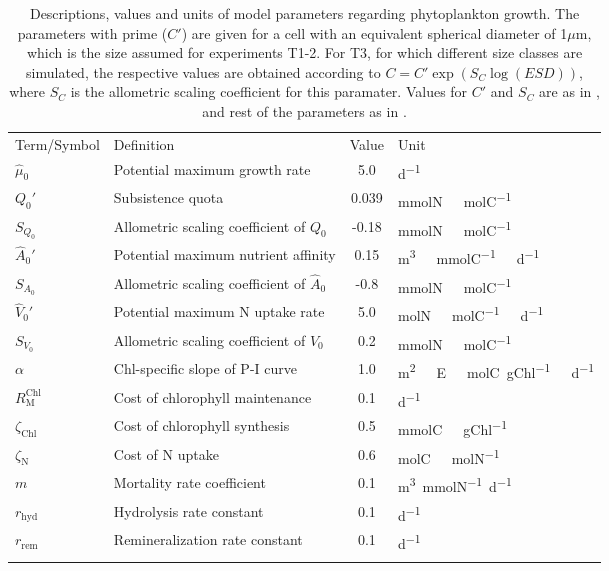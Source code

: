 \documentclass[gmd, manuscript]{copernicus}
\begin{document}
\begin{table*}[htb]
  \caption{ Descriptions, values and units of model parameters regarding phytoplankton growth. The parameters with prime ($C'$) are given for a cell with an equivalent spherical diameter of 1$\mu$m, which is the size assumed for experiments T1-2. For T3, for which different size classes are simulated, the respective values are obtained according to $C=C'\exp{(S_C \log (ESD))}$, where $S_C$ is the allometric scaling coefficient for this paramater. Values for $C'$ and $S_C$ are as in \citet{Smith2016}, and rest of the parameters as in \citet{Kerimoglu2021}. \label{T.pars}}
  \begin{tabular}{l l c l}
    \tophline
    Term/Symbol         & Definition                        & Value     & Unit\\
    \middlehline
    $\hat{\mu}_0$   & Potential maximum growth rate         & 5.0       & \unit{d^{-1}}\\
    $Q_0'$  & Subsistence quota                     & 0.039     & \unit{mmolN\ molC^{-1}}\\
    $S_{Q_0}$  & Allometric scaling coefficient of $Q_0$       & -0.18     & \unit{mmolN\ molC^{-1}}\\
    $\hat{A}_0'$     & Potential maximum nutrient affinity   & 0.15       & \unit{m^3\ mmolC^{-1}\ d^{-1}}\\
    $S_{A_0}$  & Allometric scaling coefficient of $\hat{A}_0$        & -0.8     & \unit{mmolN\ molC^{-1}}\\
    $\hat{V}_0'$     & Potential maximum N uptake rate       & 5.0       & \unit{molN\ molC^{-1}\ d^{-1}}\\
    $S_{V_0}$  & Allometric scaling coefficient of $\hat{V}_0$        & 0.2     & \unit{mmolN\ molC^{-1}}\\
    $\alpha$           & Chl-specific slope of P-I curve    & 1.0       & \unit{m^2\ E\ molC gChl^{-1}\ d^{-1}}\\
    $R^{\text{Chl}}_{\text{M}}$     & Cost of chlorophyll maintenance   & 0.1       & \unit{d^{-1}}\\
    $\zeta_{\text{Chl}}$   & Cost of chlorophyll synthesis  & 0.5       & \unit{mmolC\ gChl^{-1}}\\
    $\zeta_{\text{N}}$     & Cost of N uptake               & 0.6       & \unit{molC\ molN^{-1}}\\
    $m$                & Mortality rate coefficient        & 0.1   & \unit{m^{3} mmolN^{-1} d^{-1}} \\
    $r_{\text{hyd}}$   & Hydrolysis rate constant          & 0.1   & \unit{d^{-1}} \\
    $r_{\text{rem}}$   & Remineralization rate constant    & 0.1   & \unit{d^{-1}} \\
    \bottomhline
  \end{tabular}
  \belowtable{} %
\end{table*}
\end{document}
